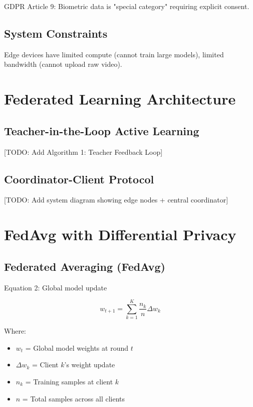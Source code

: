 \documentclass[conference]{IEEEtran}
\begin{document}
GDPR Article 9: Biometric data is "special category" requiring explicit consent.

\subsection{System Constraints}

Edge devices have limited compute (cannot train large models), limited bandwidth (cannot upload raw video).

\section{Federated Learning Architecture}

\subsection{Teacher-in-the-Loop Active Learning}

[TODO: Add Algorithm 1: Teacher Feedback Loop]

\subsection{Coordinator-Client Protocol}

[TODO: Add system diagram showing edge nodes + central coordinator]

\section{FedAvg with Differential Privacy}

\subsection{Federated Averaging (FedAvg)}

Equation 2: Global model update

\begin{equation}
w_{t+1} = \sum_{k=1}^{K} \frac{n_k}{n} \Delta w_k
\end{equation}

Where:
\begin{itemize}
    \item $w_t$ = Global model weights at round $t$
    \item $\Delta w_k$ = Client $k$'s weight update
    \item $n_k$ = Training samples at client $k$
    \item $n$ = Total samples across all clients
\end{itemize}
\end{document}
